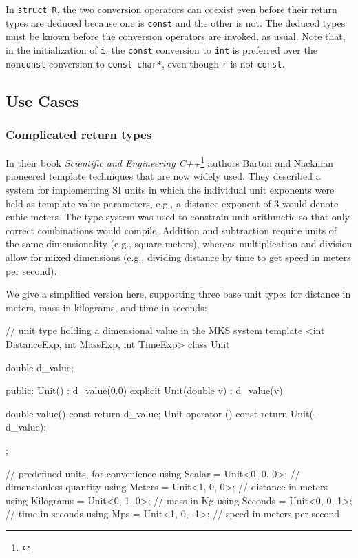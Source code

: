 \noindent In \lstinline!struct!~\lstinline!R!, the two conversion operators can coexist
even before their return types are deduced because one is \lstinline!const!
and the other is not. The deduced types must be known before the
conversion operators are invoked, as usual. Note that, in the
initialization of \lstinline!i!, the \lstinline!const! conversion to
\lstinline!int! is preferred over the non\lstinline!const! conversion to
\lstinline!const!~\lstinline!char*!, even though \lstinline!r! is not
\lstinline!const!.

\subsection[Use Cases]{Use Cases}\label{use-cases}

\subsubsection[Complicated return types]{Complicated return types}\label{complicated-return-types}

In their book \emph{Scientific and Engineering
C++}{\cprotect\footnote{\cite{barton94}}} authors Barton and Nackman pioneered
template techniques that are now widely used. They described a system
for implementing SI units in which the individual unit exponents were
held as template value parameters, e.g., a distance exponent of 3 would
denote cubic meters. The type system was used to constrain unit
arithmetic so that only correct combinations would compile. Addition and
subtraction require units of the same dimensionality (e.g., square
meters), whereas multiplication and division allow for mixed dimensions
(e.g., dividing distance by time to get speed in meters per second).

We give a simplified version here, supporting three base unit types for
distance in meters, mass in kilograms, and time in seconds:

\begin{emcppslisting}[emcppsbatch={e5,e6},emcppsstandards={c++14}]
// unit type holding a dimensional value in the MKS system
template <int DistanceExp, int MassExp, int TimeExp>
class Unit
{
    double d_value;

public:
    Unit() : d_value(0.0) { }
    explicit Unit(double v) : d_value(v) { }

    double value() const { return d_value; }
    Unit operator-() const { return Unit(-d_value); }
};

// predefined units, for convenience
using Scalar    = Unit<0, 0, 0>;   // dimensionless quantity
using Meters    = Unit<1, 0, 0>;   // distance in meters
using Kilograms = Unit<0, 1, 0>;   // mass in Kg
using Seconds   = Unit<0, 0, 1>;   // time in seconds
using Mps       = Unit<1, 0, -1>;  // speed in meters per second
\end{emcppslisting}
    

